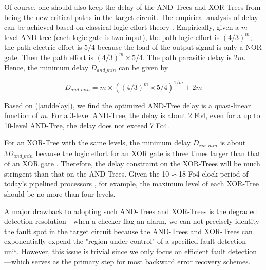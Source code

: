 Of course, one should also keep the delay of the AND-Trees and XOR-Trees from being the new critical paths in the target circuit. The empirical analysis of delay can be achieved based on classical logic effort theory \cite{Logic_effort}. Empirically, given a $m$-level AND-tree (each logic gate is two-input), the path logic effort is $(4/3)^m$; the path electric effort is $5/4$ because the load of the output signal is only a NOR gate. Then the path effort is $(4/3)^m\times 5/4$. The path parasitic delay is $2m$.  Hence, the minimum delay $D_{and\_min}$ can be given by

\begin{equation}\label{anddelay}
  D_{and\_min}=m\times ((4/3)^m\times 5/4)^{1/m} + 2m
\end{equation}

Based on  (\ref{anddelay}), we find the optimized AND-Tree delay is a quasi-linear function of $m$. For a 3-level AND-Tree, the delay is about 2 Fo4, even for a up to 10-level AND-Tree, the delay does not exceed 7 Fo4.

For an XOR-Tree with the same levels, the minimum delay $D_{xor\_min}$ is about $3 D_{and\_min}$ because the logic effort for an XOR gate is three times larger than that of an XOR gate \cite{Logic_effort}. Therefore, the delay constraint on the XOR-Trees will be much stringent than that on the AND-Trees. Given the 10$\backsim$18 Fo4 clock period of today's pipelined processors \cite{Victor_TC04}, for example, the maximum level of each XOR-Tree should be no more than four levels.


A major drawback to adopting such AND-Trees and XOR-Trees is the degraded detection resolution---when a checker flag an alarm, we can not precisely identity the fault spot in the target circuit because  the AND-Trees and XOR-Trees can exponentially expend the "region-under-control" of a specified fault detection unit. However, this issue is trivial since we only focus on efficient fault detection---which serves as the primary step for most backward error recovery schemes. 

